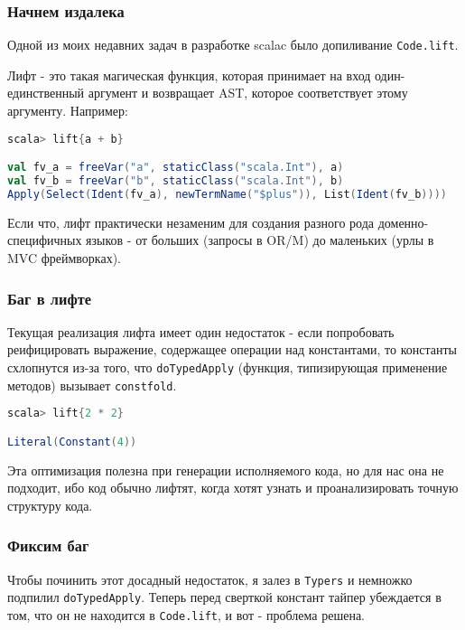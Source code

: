 \documentclass{beamer}
\begin{document}
\begin{frame}[t,fragile]
\frametitle{Начнем издалека}

Одной из моих недавних задач в разработке scalac было допиливание \texttt{Code.lift}. 

Лифт - это такая магическая функция, которая принимает на вход один-единственный аргумент и возвращает AST, которое соответствует этому аргументу. Например:

\begin{lstlisting}[language=scala]
scala> lift{a + b}

val fv_a = freeVar("a", staticClass("scala.Int"), a)
val fv_b = freeVar("b", staticClass("scala.Int"), b)
Apply(Select(Ident(fv_a), newTermName("$plus")), List(Ident(fv_b))))
\end{lstlisting}%

Если что, лифт практически незаменим для создания разного рода доменно-специфичных языков - от больших (запросы в OR/M) до маленьких (урлы в MVC фреймворках).
\end{frame}

\begin{frame}[t,fragile]
\frametitle{Баг в лифте}

Текущая реализация лифта имеет один недостаток - если попробовать реифицировать выражение, содержащее операции над константами, то константы схлопнутся из-за того, что \texttt{doTypedApply} (функция, типизирующая применение методов) вызывает \texttt{constfold}. 

\begin{lstlisting}[language=scala]
scala> lift{2 * 2}

Literal(Constant(4))
\end{lstlisting}

Эта оптимизация полезна при генерации исполняемого кода, но для нас она не подходит, ибо код обычно лифтят, когда хотят узнать и проанализировать точную структуру кода.
\end{frame}

\begin{frame}[t,fragile]
\frametitle{Фиксим баг}

Чтобы починить этот досадный недостаток, я залез в \texttt{Typers} и немножко подпилил \texttt{doTypedApply}. Теперь перед сверткой констант тайпер убеждается в том, что он не находится в \texttt{Code.lift}, и вот - проблема решена.

\end{frame}
\end{document}
